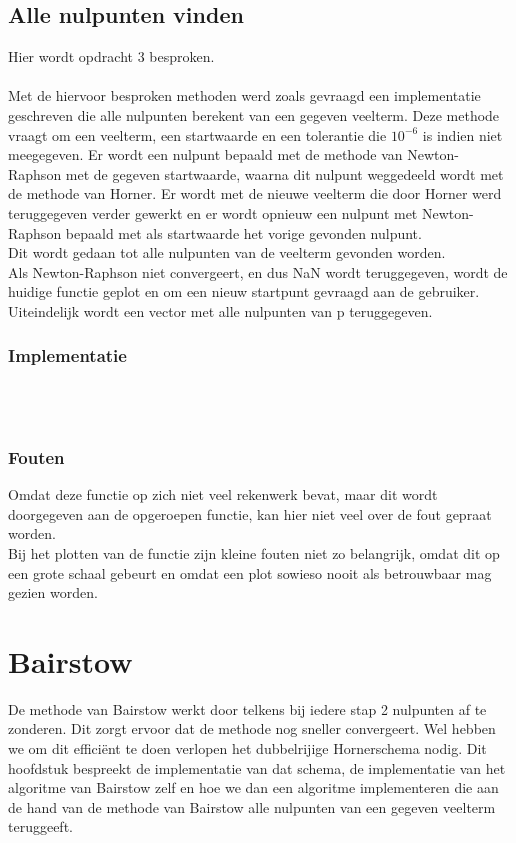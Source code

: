 \documentclass[a4paper,kulak]{kulakarticle}
\begin{document}
\subsection{Alle nulpunten vinden}
Hier wordt opdracht 3 besproken.\\~\\
Met de hiervoor besproken methoden werd zoals gevraagd een implementatie geschreven die alle nulpunten berekent van een gegeven veelterm. Deze methode vraagt om een veelterm, een startwaarde en een tolerantie die $10^{-6}$ is indien niet meegegeven. Er wordt een nulpunt bepaald met de methode van Newton-Raphson met de gegeven startwaarde, waarna dit nulpunt weggedeeld wordt met de methode van Horner. Er wordt met de nieuwe veelterm die door Horner werd teruggegeven verder gewerkt en er wordt opnieuw een nulpunt met Newton-Raphson bepaald met als startwaarde het vorige gevonden nulpunt.
\\
Dit wordt gedaan tot alle nulpunten van de veelterm gevonden worden.
\\
Als Newton-Raphson niet convergeert, en dus NaN wordt teruggegeven, wordt de huidige functie geplot en om een nieuw startpunt gevraagd aan de gebruiker.\\
Uiteindelijk wordt een vector met alle nulpunten van p teruggegeven.

\subsubsection{Implementatie}

~\\~\\

\subsubsection{Fouten}
Omdat deze functie op zich niet veel rekenwerk bevat, maar dit wordt doorgegeven aan de opgeroepen functie, kan hier niet veel over de fout gepraat worden.
\\
Bij het plotten van de functie zijn kleine fouten niet zo belangrijk, omdat dit op een grote schaal gebeurt en omdat een plot sowieso nooit als betrouwbaar mag gezien worden.

\section{Bairstow}
De methode van Bairstow werkt door telkens bij iedere stap 2 nulpunten af te zonderen. Dit zorgt ervoor dat de methode nog sneller convergeert. Wel hebben we om dit efficiënt te doen verlopen het dubbelrijige Hornerschema nodig. Dit hoofdstuk bespreekt de implementatie van dat schema, de implementatie van het algoritme van Bairstow zelf en hoe we dan een algoritme implementeren die aan de hand van de methode van Bairstow alle nulpunten van een gegeven veelterm teruggeeft.
\end{document}
